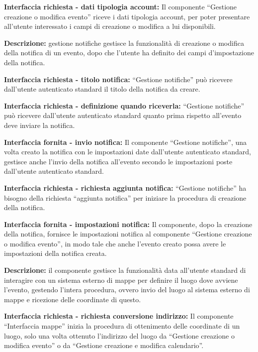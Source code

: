 \begin{listaPersonale}[]{}
    \textbf{Interfaccia richiesta - dati tipologia account:} Il componente “Gestione creazione o modifica evento” riceve i dati tipologia account, per poter presentare all'utente interessato i campi di creazione o modifica a lui disponibili.



    \textbf{Descrizione:} gestione notifiche gestisce la funzionalità di creazione o modifica della notifica di un evento, dopo che l'utente ha definito dei campi d'impostazione della notifica.

    \textbf{Interfaccia richiesta - titolo notifica:} “Gestione notifiche” può ricevere dall'utente autenticato standard il titolo della notifica da creare.

    \textbf{Interfaccia richiesta - definizione quando riceverla:} “Gestione notifiche” può ricevere dall'utente autenticato standard quanto prima rispetto all'evento deve inviare la notifica.

    \textbf{Interfaccia fornita - invio notifica:} Il componente “Gestione notifiche”, una volta creato la notifica con le impostazioni date dall'utente autenticato standard, gestisce anche l'invio della notifica all'evento secondo le impostazioni poste dall'utente autenticato standard.

    \textbf{Interfaccia richiesta - richiesta aggiunta notifica:} “Gestione notifiche” ha bisogno della richiesta “aggiunta notifica” per iniziare la procedura di creazione della notifica.

    \textbf{Interfaccia fornita - impostazioni notifica:} Il componente, dopo la creazione della notifica, fornisce le impostazioni notifica al componente “Gestione creazione o modifica evento”, in modo tale che anche l'evento creato possa avere le impostazioni della notifica creata.



    \textbf{Descrizione:} il componente gestisce la funzionalità data all'utente standard di interagire con un sistema esterno di mappe per definire il luogo dove avviene l'evento, gestendo l'intera procedura, ovvero invio del luogo al sistema esterno di mappe e ricezione delle coordinate di questo.

    \textbf{Interfaccia richiesta - richiesta conversione indirizzo:}   Il componente “Interfaccia mappe” inizia la procedura di ottenimento delle coordinate di un luogo, solo una volta ottenuto l'indirizzo del luogo da “Gestione creazione o modifica evento” o da “Gestione creazione e modifica calendario”.


\end{listaPersonale}
